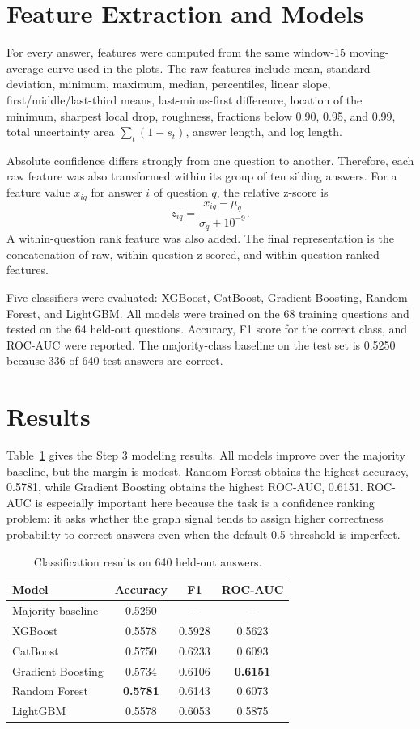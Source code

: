 \documentclass[conference]{IEEEtran}
\begin{document}
\section{Feature Extraction and Models}
For every answer, features were computed from the same window-15 moving-average
curve used in the plots. The raw features include mean, standard deviation,
minimum, maximum, median, percentiles, linear slope, first/middle/last-third
means, last-minus-first difference, location of the minimum, sharpest local
drop, roughness, fractions below 0.90, 0.95, and 0.99, total uncertainty area
$\sum_t (1-s_t)$, answer length, and log length.

Absolute confidence differs strongly from one question to another. Therefore,
each raw feature was also transformed within its group of ten sibling answers.
For a feature value $x_{iq}$ for answer $i$ of question $q$, the relative
z-score is
\begin{equation}
    z_{iq} = \frac{x_{iq} - \mu_q}{\sigma_q + 10^{-9}}.
\end{equation}
A within-question rank feature was also added. The final representation is the
concatenation of raw, within-question z-scored, and within-question ranked
features.

Five classifiers were evaluated: XGBoost, CatBoost, Gradient Boosting, Random
Forest, and LightGBM. All models were trained on the 68 training questions and
tested on the 64 held-out questions. Accuracy, F1 score for the correct class,
and ROC-AUC were reported. The majority-class baseline on the test set is
0.5250 because 336 of 640 test answers are correct.

\section{Results}
Table~\ref{tab:results} gives the Step 3 modeling results. All models improve
over the majority baseline, but the margin is modest. Random Forest obtains the
highest accuracy, 0.5781, while Gradient Boosting obtains the highest ROC-AUC,
0.6151. ROC-AUC is especially important here because the task is a confidence
ranking problem: it asks whether the graph signal tends to assign higher
correctness probability to correct answers even when the default 0.5 threshold
is imperfect.

\begin{table}[t]
\caption{Classification results on 640 held-out answers.}
\label{tab:results}
\centering
\begin{tabular}{lccc}
\toprule
Model & Accuracy & F1 & ROC-AUC \\
\midrule
Majority baseline & 0.5250 & -- & -- \\
XGBoost & 0.5578 & 0.5928 & 0.5623 \\
CatBoost & 0.5750 & 0.6233 & 0.6093 \\
Gradient Boosting & 0.5734 & 0.6106 & \textbf{0.6151} \\
Random Forest & \textbf{0.5781} & 0.6143 & 0.6073 \\
LightGBM & 0.5578 & 0.6053 & 0.5875 \\
\bottomrule
\end{tabular}
\end{table}
\end{document}
